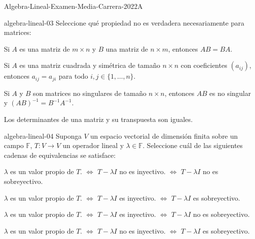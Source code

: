 \documentclass[10pt]{article}
\begin{document}
\begin{quiz}{Algebra-Lineal-Examen-Media-Carrera-2022A}

\begin{multi}{algebra-lineal-03}
    Seleccione qu\'e propiedad no es verdadera necesariamente para matrices:
    \item* Si $A$ es una matriz de $m\times n$ y $B$ una matriz de $n\times m$, entonces $AB = BA.$
    \item[fraction=0] Si $A$ es una matriz cuadrada y sim\'etrica de tama\~no $n\times n$ con coeficientes $(a_{ij})$, entonces $a_{ij}=a_{ji}$ para todo $i,j\in\lbrace 1,\ldots,n\rbrace.$
    \item[fraction=0] Si $A$ y $B$ son matrices no singulares de tama\~no $n\times n$, entonces $AB$ es no singular y $(AB)^{-1}=B^{-1}A^{-1}.$
    \item[fraction=0] Los determinantes de una matriz y su transpuesta son iguales.
\end{multi}


\begin{multi}{algebra-lineal-04}
    Suponga $V$ un espacio vectorial de dimensi\'on finita sobre un campo $\mathbb F$, $T\colon V\longrightarrow V$ un operador lineal y $\lambda \in \mathbb F.$ Seleccione cu\'al de las siguientes cadenas de equivalencias se satisface:
    \item* $\lambda$ es un valor propio de $T.$ $\Longleftrightarrow$ $T-\lambda I$ no es inyectivo. $\Longleftrightarrow$ $T-\lambda I$ no es sobreyectivo.
    \item[fraction=0]  $\lambda$ es un valor propio de $T.$ $\Longleftrightarrow$ $T-\lambda I$ es inyectivo. $\Longleftrightarrow$ $T-\lambda I$ es sobreyectivo.
    \item[fraction=0] $\lambda$ es un valor propio de $T.$ $\Longleftrightarrow$ $T-\lambda I$ es inyectivo. $\Longleftrightarrow$ $T-\lambda I$ no es sobreyectivo.
    \item[fraction=0] $\lambda$ es un valor propio de $T.$ $\Longleftrightarrow$ $T-\lambda I$ no es inyectivo. $\Longleftrightarrow$ $T-\lambda I$ es sobreyectivo.
\end{multi}
\end{quiz}
\end{document}
